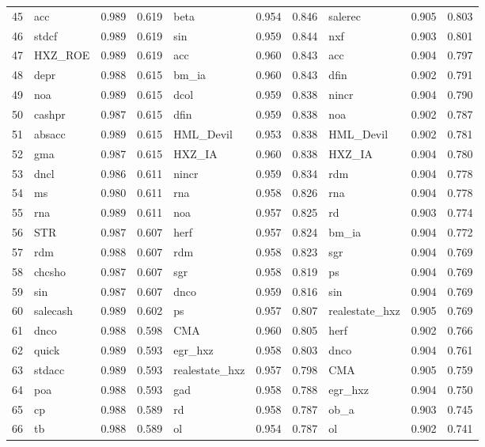 \begin{landscape}
\begin{footnotesize}
\begin{longtable}{l|lcc|lcc|lcc}
  45 & acc & 0.989 & 0.619 & beta & 0.954 & 0.846 & salerec & 0.905 & 0.803 \\ 
  46 & stdcf & 0.989 & 0.619 & sin & 0.959 & 0.844 & nxf & 0.903 & 0.801 \\ 
  47 & HXZ\_ROE & 0.989 & 0.619 & acc & 0.960 & 0.843 & acc & 0.904 & 0.797 \\ 
  48 & depr & 0.988 & 0.615 & bm\_ia & 0.960 & 0.843 & dfin & 0.902 & 0.791 \\ 
  49 & noa & 0.989 & 0.615 & dcol & 0.959 & 0.838 & nincr & 0.904 & 0.790 \\ 
  50 & cashpr & 0.987 & 0.615 & dfin & 0.959 & 0.838 & noa & 0.902 & 0.787 \\ 
  51 & absacc & 0.989 & 0.615 & HML\_Devil & 0.953 & 0.838 & HML\_Devil & 0.902 & 0.781 \\ 
  52 & gma & 0.987 & 0.615 & HXZ\_IA & 0.960 & 0.838 & HXZ\_IA & 0.904 & 0.780 \\ 
  53 & dncl & 0.986 & 0.611 & nincr & 0.959 & 0.834 & rdm & 0.904 & 0.778 \\ 
  54 & ms & 0.980 & 0.611 & rna & 0.958 & 0.826 & rna & 0.904 & 0.778 \\ 
  55 & rna & 0.989 & 0.611 & noa & 0.957 & 0.825 & rd & 0.903 & 0.774 \\ 
  56 & STR & 0.987 & 0.607 & herf & 0.957 & 0.824 & bm\_ia & 0.904 & 0.772 \\ 
  57 & rdm & 0.988 & 0.607 & rdm & 0.958 & 0.823 & sgr & 0.904 & 0.769 \\ 
  58 & chcsho & 0.987 & 0.607 & sgr & 0.958 & 0.819 & ps & 0.904 & 0.769 \\ 
  59 & sin & 0.987 & 0.607 & dnco & 0.959 & 0.816 & sin & 0.904 & 0.769 \\ 
  60 & salecash & 0.989 & 0.602 & ps & 0.957 & 0.807 & realestate\_hxz & 0.905 & 0.769 \\ 
  61 & dnco & 0.988 & 0.598 & CMA & 0.960 & 0.805 & herf & 0.902 & 0.766 \\ 
  62 & quick & 0.989 & 0.593 & egr\_hxz & 0.958 & 0.803 & dnco & 0.904 & 0.761 \\ 
  63 & stdacc & 0.989 & 0.593 & realestate\_hxz & 0.957 & 0.798 & CMA & 0.905 & 0.759 \\ 
  64 & poa & 0.988 & 0.593 & gad & 0.958 & 0.788 & egr\_hxz & 0.904 & 0.750 \\ 
  65 & cp & 0.988 & 0.589 & rd & 0.958 & 0.787 & ob\_a & 0.903 & 0.745 \\ 
  66 & tb & 0.988 & 0.589 & ol & 0.954 & 0.787 & ol & 0.902 & 0.741 \\ 

\end{longtable}
\end{footnotesize}
\end{landscape}

